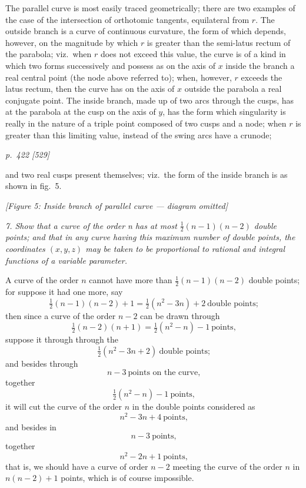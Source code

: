 \documentclass[11pt,a4paper]{article}
\theoremstyle{plain}
\theoremstyle{definition}
\begin{document}
The parallel curve is most easily traced geometrically; there are two examples of
the case of the intersection of orthotomic tangents, equilateral from $r$. The outside branch is a
curve of continuous curvature, the form of which depends, however, on the magnitude by
which $r$ is greater than the semi-latus rectum of the parabola; viz.\ when $r$ does not
exceed this value, the curve is of a kind in which two forms successively and possess as
on the axis of $x$ inside the branch a real central point (the node above referred to);
when, however, $r$ exceeds the latus rectum, then the curve has on the axis of $x$ outside
the parabola a real conjugate point. The inside branch, made up of two arcs through
the cusps, has at the parabola at the cusp on the axis of $y$, has the form which
singularity is really in the nature of a triple point composed of two cusps and a node;
when $r$ is greater than this limiting value, instead of the swing arcs have a crunode;

\clearpage

\bigskip
\textit{p.~422 [529]}
\smallskip

and two real cusps present themselves; viz.\ the form of the inside branch is as shown
in fig.~5.

\begin{center}
\textit{[Figure 5: Inside branch of parallel curve --- diagram omitted]}
\end{center}

\textit{7. Show that a curve of the order n has at most $\tfrac{1}{2}(n-1)(n-2)$ double points;
and that in any curve having this maximum number of double points, the coordinates
$(x, y, z)$ may be taken to be proportional to rational and integral functions of a variable
parameter.}

A curve of the order $n$ cannot have more than $\tfrac{1}{2}(n-1)(n-2)$ double points; for
suppose it had one more, say
\[
\tfrac{1}{2}(n-1)(n-2) + 1 = \tfrac{1}{2}(n^2 - 3n) + 2\ \text{double points;}
\]
then since a curve of the order $n - 2$ can be drawn through
\[
\tfrac{1}{2}(n-2)(n+1) = \tfrac{1}{2}(n^2 - n) - 1\ \text{points,}
\]
suppose it through through the
\[
\tfrac{1}{2}(n^2 - 3n + 2)\ \text{double points;}
\]
and besides through
\[
n - 3\ \text{points on the curve,}
\]
together
\[
\tfrac{1}{2}(n^2 - n) - 1\ \text{points,}
\]
it will cut the curve of the order $n$ in the double points considered as
\[
n^2 - 3n + 4\ \text{points,}
\]
and besides in
\[
n - 3\ \text{points,}
\]
together
\[
n^2 - 2n + 1\ \text{points,}
\]
that is, we should have a curve of order $n - 2$ meeting the curve of the order $n$ in
$n(n-2) + 1$ points, which is of course impossible.
\end{document}
